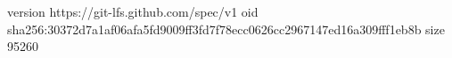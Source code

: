 version https://git-lfs.github.com/spec/v1
oid sha256:30372d7a1af06afa5fd9009ff3fd7f78ecc0626cc2967147ed16a309fff1eb8b
size 95260
